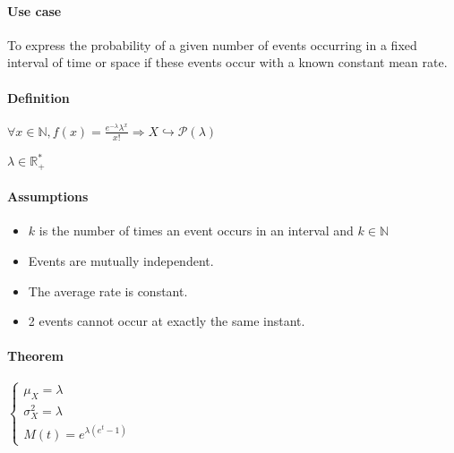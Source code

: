 \paragraph{Use case}
To express the probability of a given number of events occurring in a fixed interval
of time or space if these events occur with a known constant mean rate.

\paragraph{Definition}
\begin{center}
	$\forall x\in \mathbb{N}, f(x)= \frac{e^{-\lambda}\lambda^{x}}{x!}\Rightarrow 
	X\hookrightarrow\mathcal{P}(\lambda)$
\end{center}
$\lambda\in\mathbb{R}_{+}^{*}$

\paragraph{Assumptions}
\begin{itemize}
	\item $k$ is the number of times an event occurs in an interval and 
		$k\in\mathbb{N}$
	\item Events are mutually independent.
	\item The average rate is constant.
	\item 2 events cannot occur at exactly the same instant.
\end{itemize}

\paragraph{Theorem}
\begin{center}
$\begin{cases}
	\mu_{X}=\lambda\\
	\sigma_{X}^{2} = \lambda\\
	M(t)=e^{\lambda(e^{t}-1)}
\end{cases}$
\end{center}
